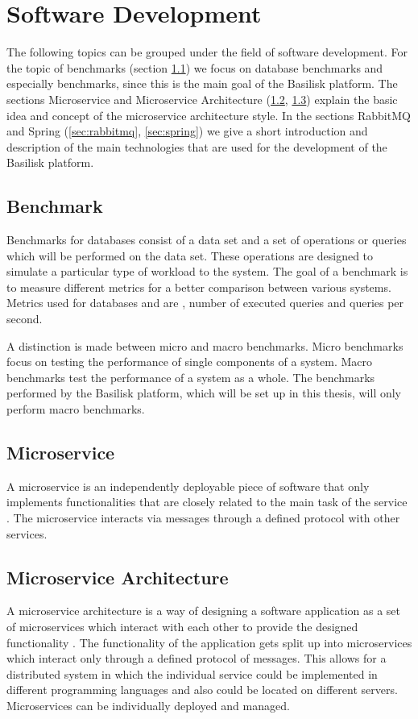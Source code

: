 \section{Software Development}
The following topics can be grouped under the field of software development.
For the topic of benchmarks (section \ref{sec:benchmark}) we focus on database benchmarks and especially \ts{} benchmarks, since this is the main goal of the Basilisk platform.
The sections Microservice and Microservice Architecture (\ref{sec:microservice}, \ref{sec:microservice_architecture}) explain the basic idea and concept of the microservice architecture style.
In the sections RabbitMQ and Spring (\ref{sec:rabbitmq}, \ref{sec:spring}) we give a short introduction and description of the main technologies that are used for the development of the Basilisk platform.

\subsection{Benchmark}
\label{sec:benchmark}
Benchmarks for databases consist of a data set and a set of operations or queries which will be performed on the data set.
These operations are designed to simulate a particular type of workload to the system.
The goal of a benchmark is to measure different metrics for a better comparison between various systems.
Metrics used for databases and \tsp{} are \eg, number of executed queries and queries per second\cite{IguanaDocumentationMetrics}.

A distinction is made between micro and macro benchmarks.
Micro benchmarks focus on testing the performance of single components of a system.
Macro benchmarks test the performance of a system as a whole.
The benchmarks performed by the Basilisk platform, which will be set up in this thesis, will only perform macro benchmarks.

\subsection{Microservice}
\label{sec:microservice}
A microservice is an independently deployable piece of software that only implements functionalities that are closely related to the main task of the service \cite{dragoniMicroservicesYesterdayToday2017}.
The microservice interacts via messages through a defined protocol with other services.

\subsection{Microservice Architecture}
\label{sec:microservice_architecture}
A microservice architecture is a way of designing a software application as a set of microservices which interact with each other to provide the designed functionality \cite{dragoniMicroservicesYesterdayToday2017, MicroservicesHttpsMartinfowler}.
The functionality of the application gets split up into microservices which interact only through a defined protocol of messages.
This allows for a distributed system in which the individual service could be implemented in different programming languages and also could be located on different servers.
Microservices can be individually deployed and managed.


